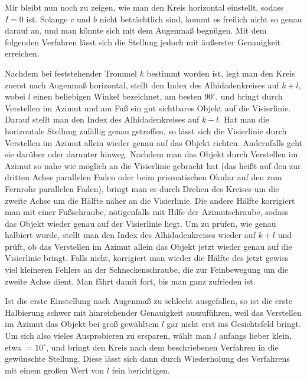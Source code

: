 \par\indent Mir bleibt nun noch zu zeigen, wie man den Kreis horizontal einstellt, sodass $I=0$ ist. Solange $c$ und $b$ nicht beträchtlich sind, kommt es freilich nicht so genau darauf an, und man könnte sich mit dem Augenmaß begnügen. Mit dem folgenden Verfahren lässt sich die Stellung jedoch mit äußerster Genauigkeit erreichen.

\par\indent Nachdem bei feststehender Trommel $k$ bestimmt worden ist, legt man den Kreis zuerst nach Augenmaß horizontal, stellt den Index des Alhidadenkreises auf $k+l$, wobei $l$ einen beliebigen Winkel bezeichnet, am besten $90^\circ$, und bringt durch Verstellen im Azimut und am Fuß ein gut sichtbares Objekt auf die Visierlinie. Darauf stellt man den Index des Alhidadenkreises auf $k-l$. Hat man die horizontale Stellung zufällig genau getroffen, so lässt sich die Visierlinie durch Verstellen im Azimut allein wieder genau auf das Objekt richten. Andernfalls geht sie darüber oder darunter hinweg. Nachdem man das Objekt durch Verstellen im Azimut so nahe wie möglich an die Visierlinie gebracht hat (das heißt auf den zur dritten Achse parallelen Faden oder beim prismatischen Okular auf den zum Fernrohr parallelen Faden), bringt man es durch Drehen des Kreises um die zweite Achse um die Hälfte näher an die Visierlinie. Die andere Hälfte korrigiert man mit einer Fußschraube, nötigenfalls mit Hilfe der Azimutschraube, sodass das Objekt wieder genau auf der Visierlinie liegt. Um zu prüfen, wie genau halbiert wurde, stellt man den Index des Alhidadenkreises wieder auf $k+l$ und prüft, ob das Verstellen im Azimut allein das Objekt jetzt wieder genau auf die Visierlinie bringt. Falls nicht, korrigiert man wieder die Hälfte des jetzt gewiss viel kleineren Fehlers an der Schneckenschraube, die zur Feinbewegung um die zweite Achse dient. Man fährt damit fort, bis man ganz zufrieden ist.

\par\indent Ist die erste Einstellung nach Augenmaß zu schlecht ausgefallen, so ist die erste Halbierung schwer mit hinreichender Genauigkeit auszuführen, weil das Verstellen im Azimut das Objekt bei groß gewähltem $l$ gar nicht erst ins Gesichtsfeld bringt. Um sich also vieles Ausprobieren zu ersparen, wählt man $l$ anfangs lieber klein, etwa $=10^\circ$, und bringt den Kreis nach dem beschriebenen Verfahren in die gewünschte Stellung. Diese lässt sich dann durch Wiederholung des Verfahrens mit einem großen Wert von $l$ fein berichtigen.

